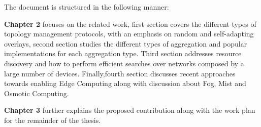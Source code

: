The document is structured in the following manner:

\textbf{Chapter 2} focuses on the related work, first section covers the different types of topology management protocols,
with an emphasis on random and self-adapting overlays, second section studies the different types of aggregation and  popular implementations for each aggregation type. Third section addresses resource discovery and how to perform efficient searches over networks composed by a large number of devices. Finally,fourth section discusses recent approaches towards enabling Edge Computing along with discussion about Fog, Mist and Osmotic Computing.

\textbf{Chapter 3} further explains the proposed contribution along with the work plan for the remainder of the thesis. 



